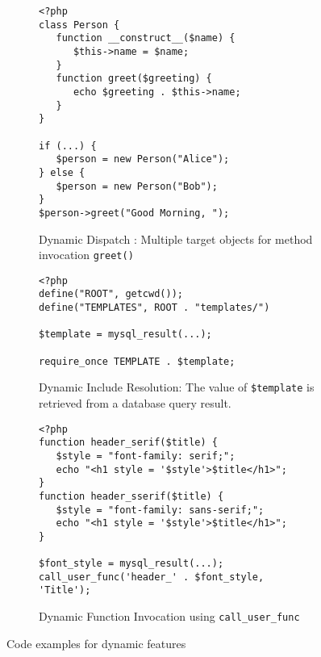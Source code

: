\documentclass[sigconf, preprint]{acmart}
\renewcommand{\tt}[1]{\texttt{#1}}
\begin{document}
\begin{figure}[t]
	\begin{subfigure}[b]{0.48\textwidth}
	
\begin{lstlisting}
<?php
class Person {
   function __construct__($name) {
      $this->name = $name;
   }
   function greet($greeting) {
      echo $greeting . $this->name;
   }
}

if (...) {
   $person = new Person("Alice");
} else {
   $person = new Person("Bob");
}
$person->greet("Good Morning, ");
\end{lstlisting}
	\caption{
		Dynamic Dispatch : Multiple target objects for method invocation \tt{greet()} 
		\label{fig:multi_target}
	}
	\end{subfigure}
	\vspace{1mm}
	\hfill
	\begin{subfigure}[b]{0.48\textwidth}

\begin{lstlisting}
<?php
define("ROOT", getcwd());
define("TEMPLATES", ROOT . "templates/")

$template = mysql_result(...);

require_once TEMPLATE . $template;
\end{lstlisting}
	\caption{
		Dynamic Include Resolution: The value of \tt{\$template} is retrieved from a
		database query result.
		\label{fig:dynamic_includes}
	}
	\end{subfigure}
	\vspace{1mm}
	\hfill
	\begin{subfigure}[b]{0.48\textwidth}

\begin{lstlisting}
<?php
function header_serif($title) {
   $style = "font-family: serif;";
   echo "<h1 style = '$style'>$title</h1>";
}
function header_sserif($title) {
   $style = "font-family: sans-serif;";
   echo "<h1 style = '$style'>$title</h1>";
}

$font_style = mysql_result(...);
call_user_func('header_' . $font_style, 'Title');
\end{lstlisting}
	\caption{
		Dynamic Function Invocation using \tt{call\_user\_func}
		\label{fig:indirect_calls}
	}
	
	\end{subfigure}
	\caption{
		Code examples for dynamic features
		\label{fig:defective_code_features}
	}
\end{figure}
\end{document}
